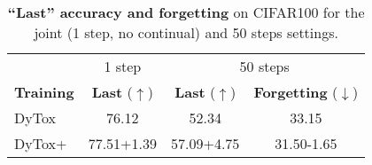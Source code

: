 \begin{table}[t]
    \centering
    \begin{tabular}{@{}l|c|cc}
        \hline
                          & 1 step                                          & \multicolumn{2}{c}{50 steps}                                                                             \\
        \textbf{Training} & \textbf{Last} ($\uparrow$)                      & \textbf{Last} ($\uparrow$)                      & \textbf{Forgetting} ($\downarrow$)\Tstrut\Bstrut       \\
        \hline
        DyTox             & 76.12                                           & 52.34                                           & 33.15 \Tstrut                                          \\
        DyTox+            & 77.51\scriptsize{\textcolor{OliveGreen}{+1.39}} & 57.09\scriptsize{\textcolor{OliveGreen}{+4.75}} & 31.50\scriptsize{\textcolor{OliveGreen}{-1.65}}\Bstrut \\
        \hline
    \end{tabular}
    \caption{\textbf{``Last'' accuracy and forgetting} \cite{chaudhry2018riemannien_walk} on
        CIFAR100 for the joint (1 step, no continual) and 50 steps settings.\vspace{-1em}}
    \label{tab:dytox_training_plus}
\end{table}
